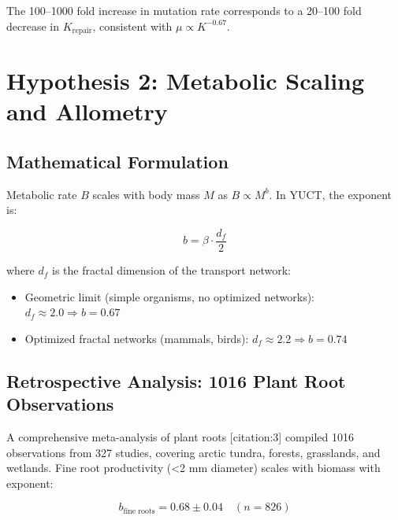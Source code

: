 \documentclass[11pt]{article}
\begin{document}
	The 100–1000 fold increase in mutation rate corresponds to a 20–100 fold decrease in \(K_{\text{repair}}\), consistent with \(\mu \propto K^{-0.67}\).
	
	\section{Hypothesis 2: Metabolic Scaling and Allometry}
	
	\subsection{Mathematical Formulation}
	
	Metabolic rate \(B\) scales with body mass \(M\) as \(B \propto M^{b}\). In YUCT, the exponent is:
	
	\begin{equation}
		b = \beta \cdot \frac{d_f}{2}
		\label{eq:metabolic-scaling}
	\end{equation}
	
	where \(d_f\) is the fractal dimension of the transport network:
	\begin{itemize}
		\item Geometric limit (simple organisms, no optimized networks): \(d_f \approx 2.0 \Rightarrow b = 0.67\)
		\item Optimized fractal networks (mammals, birds): \(d_f \approx 2.2 \Rightarrow b = 0.74\)
	\end{itemize}
	
	\subsection{Retrospective Analysis: 1016 Plant Root Observations}
	
	A comprehensive meta-analysis of plant roots [citation:3] compiled 1016 observations from 327 studies, covering arctic tundra, forests, grasslands, and wetlands. Fine root productivity (<2 mm diameter) scales with biomass with exponent:
	
	\begin{equation}
		b_{\text{fine roots}} = 0.68 \pm 0.04 \quad (n = 826)
		\label{eq:plant-scaling}
	\end{equation}
	
\end{document}
